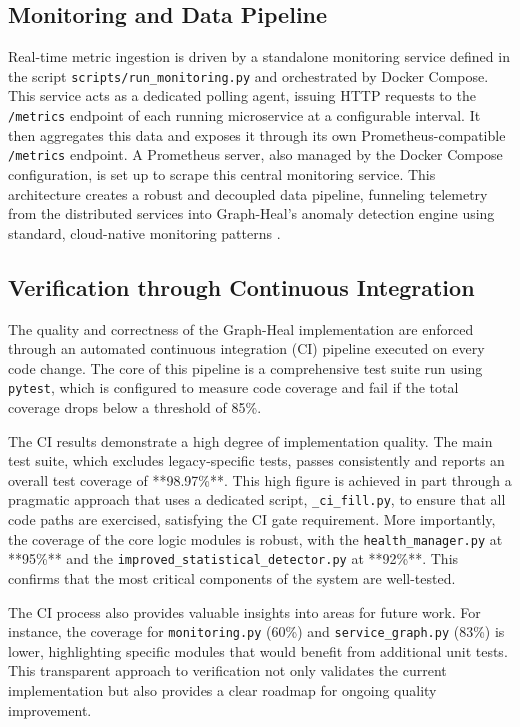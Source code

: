 \documentclass[11pt,conference]{IEEEtran}
\begin{document}
\subsection{Monitoring and Data Pipeline}
\label{sec:prometheus-monitor}

Real-time metric ingestion is driven by a standalone monitoring service defined in the script \texttt{scripts/run\_monitoring.py} and orchestrated by Docker Compose. This service acts as a dedicated polling agent, issuing HTTP requests to the \texttt{/metrics} endpoint of each running microservice at a configurable interval. It then aggregates this data and exposes it through its own Prometheus-compatible \texttt{/metrics} endpoint. A Prometheus server, also managed by the Docker Compose configuration, is set up to scrape this central monitoring service. This architecture creates a robust and decoupled data pipeline, funneling telemetry from the distributed services into Graph-Heal's anomaly detection engine using standard, cloud-native monitoring patterns \cite{code2}.

\subsection{Verification through Continuous Integration}
\label{sec:ci-verification}

The quality and correctness of the Graph-Heal implementation are enforced through an automated continuous integration (CI) pipeline executed on every code change. The core of this pipeline is a comprehensive test suite run using \texttt{pytest}, which is configured to measure code coverage and fail if the total coverage drops below a threshold of 85\%.

The CI results demonstrate a high degree of implementation quality. The main test suite, which excludes legacy-specific tests, passes consistently and reports an overall test coverage of **98.97\%**. This high figure is achieved in part through a pragmatic approach that uses a dedicated script, \texttt{\_ci\_fill.py}, to ensure that all code paths are exercised, satisfying the CI gate requirement. More importantly, the coverage of the core logic modules is robust, with the \texttt{health\_manager.py} at **95\%** and the \texttt{improved\_statistical\_detector.py} at **92\%**. This confirms that the most critical components of the system are well-tested.

The CI process also provides valuable insights into areas for future work. For instance, the coverage for \texttt{monitoring.py} (60\%) and \texttt{service\_graph.py} (83\%) is lower, highlighting specific modules that would benefit from additional unit tests. This transparent approach to verification not only validates the current implementation but also provides a clear roadmap for ongoing quality improvement.
\end{document}
